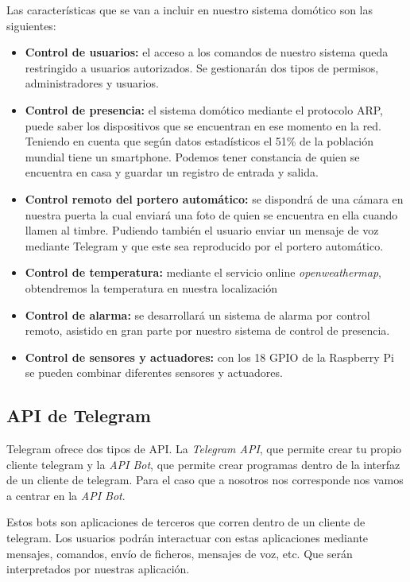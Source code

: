 \documentclass[10pt,journal,compsoc]{IEEEtran}
\begin{document}
Las características que se van a incluir en nuestro sistema domótico son las siguientes:
\begin{itemize}
\item \textbf{Control de usuarios:} el acceso a los comandos de nuestro sistema queda restringido a 
usuarios autorizados. Se gestionarán dos tipos de permisos, administradores y usuarios.
\item \textbf{Control de presencia:} el sistema domótico mediante el protocolo ARP, puede saber los 
dispositivos que se encuentran en ese momento en la red. Teniendo en cuenta que según datos 
estadísticos el 51\% de la población mundial tiene un smartphone. Podemos tener constancia de 
quien se encuentra en casa y guardar un registro de entrada y salida.
\item \textbf{Control remoto del portero automático:} se dispondrá de una cámara en nuestra puerta la cual 
enviará una foto de quien se encuentra en ella cuando llamen al timbre. Pudiendo también 
el usuario enviar un mensaje de voz mediante Telegram y que este sea reproducido 
por el portero automático.
\item \textbf{Control de temperatura:} mediante el servicio online \textit{openweathermap}, obtendremos la 
temperatura en nuestra localización
\item \textbf{Control de alarma:} se desarrollará un sistema de alarma por control remoto, asistido en 
gran parte por nuestro sistema de control de presencia.
\item \textbf{Control de sensores y actuadores:} con los 18 GPIO de la Raspberry Pi se pueden combinar 
diferentes sensores y actuadores.
\end{itemize}

\subsection{API de Telegram}
Telegram ofrece dos tipos de API. La \textit{Telegram API}, que permite crear tu propio cliente 
telegram y la \textit{API Bot}, que permite crear programas dentro de la interfaz de un 
cliente de telegram. Para el caso que a nosotros nos corresponde nos vamos a 
centrar en la \textit{API Bot}. 

Estos bots son aplicaciones de terceros que corren dentro de un cliente de 
telegram. Los usuarios podrán interactuar con estas aplicaciones mediante 
mensajes, comandos, envío de ficheros, mensajes de voz, etc. Que serán 
interpretados por nuestras aplicación.
\end{document}
